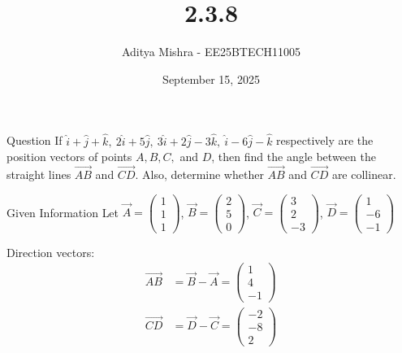 \documentclass{beamer}
\title{2.3.8}
\author{Aditya Mishra - EE25BTECH11005}
\date{September 15, 2025}
\begin{document}
                                    \frame{\titlepage}

                                    \begin{frame}{Question}
                                    If $\hat{i} + \hat{j} + \hat{k},\ 2\hat{i} + 5\hat{j},\ 3\hat{i} + 2\hat{j} - 3\hat{k},\ \hat{i} - 6\hat{j} - \hat{k}$ respectively are the position vectors of points $A, B, C,$ and $D$, then find the angle between the straight lines $\vec{AB}$ and $\vec{CD}$. Also, determine whether $\vec{AB}$ and $\vec{CD}$ are collinear.
                                    \end{frame}

                                    \begin{frame}{Given Information}
                                    \centering
                                    \label{tab:parameters}
                                    Let $\vec{A} = \begin{pmatrix}1\\1\\1\end{pmatrix}$, $\vec{B} = \begin{pmatrix}2\\5\\0\end{pmatrix}$, $\vec{C} = \begin{pmatrix}3\\2\\-3\end{pmatrix}$, $\vec{D} = \begin{pmatrix}1\\-6\\-1\end{pmatrix}$

                                    Direction vectors:
                                    \begin{align*}
                                    \vec{AB} &= \vec{B} - \vec{A} = \begin{pmatrix}1\\4\\-1\end{pmatrix} \\
                                    \vec{CD} &= \vec{D} - \vec{C} = \begin{pmatrix}-2\\-8\\2\end{pmatrix}
                                    \end{align*}
                                    \end{frame}
\end{document}
